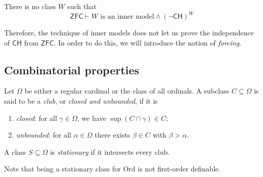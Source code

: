 \begin{lemma}[Shepherdson]
    There is no class \( W \) such that
    \[ \mathsf{ZFC} \vdash W \text{ is an inner model} \wedge (\neg\mathsf{CH})^W \]
\end{lemma}
Therefore, the technique of inner models does not let us prove the independence of \( \mathsf{CH} \) from \( \mathsf{ZFC} \).
In order to do this, we will introduce the notion of \emph{forcing}.

\subsection{Combinatorial properties}
\begin{definition}
    Let \( \Omega \) be either a regular cardinal or the class of all ordinals.
    A subclass \( C \subseteq \Omega \) is said to be a \emph{club}, or \emph{closed and unbounded}, if it is
    \begin{enumerate}
        \item \emph{closed}: for all \( \gamma \in \Omega \), we have \( \sup(C \cap \gamma) \in C \);
        \item \emph{unbounded}: for all \( \alpha \in \Omega \) there exists \( \beta \in C \) with \( \beta > \alpha \).
    \end{enumerate}
    A class \( S \subseteq \Omega \) is \emph{stationary} if it intersects every club.
\end{definition}
Note that being a stationary class for \( \mathrm{Ord} \) is not first-order definable.

